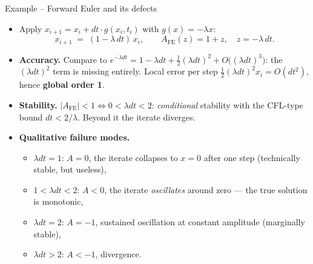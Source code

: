 \documentclass[11pt,aspectratio=169]{beamer}
\begin{document}
\begin{frame}{Example -- Forward Euler and its defects}

\begin{itemize}

\item Apply $x_{i+1} = x_i + dt\cdot g(x_i,t_i)$ with $g(x)=-\lambda x$:
  \[
  \boxed{\;x_{i+1} \;=\; (1 - \lambda\,dt)\,x_i,\qquad A_{\mathrm{FE}}(z) = 1+z,\quad z=-\lambda\,dt.\;}
  \]

\item \textbf{Accuracy.} Compare to $e^{-\lambda dt} = 1 - \lambda dt
  + \tfrac12(\lambda dt)^2 + O\bigl((\lambda dt)^3\bigr)$: the
  $(\lambda dt)^2$ term is missing entirely. Local error per step
  $\tfrac12(\lambda dt)^2 x_i = O(dt^2)$, hence \textbf{global order 1}.\newline

\item \textbf{Stability.} $|A_{\mathrm{FE}}| < 1 \iff 0 < \lambda dt
  < 2$: \emph{conditional} stability with the CFL-type bound $dt <
  2/\lambda$. Beyond it the iterate diverges.\newline

\item \textbf{Qualitative failure modes.}
  \begin{itemize}
  \item $\lambda dt = 1$: $A=0$, the iterate collapses to $x=0$ after
    one step (technically stable, but useless),
  \item $1 < \lambda dt < 2$: $A < 0$, the iterate \emph{oscillates}
    around zero — the true solution is monotonic,
  \item $\lambda dt = 2$: $A = -1$, sustained oscillation at constant
    amplitude (marginally stable),
  \item $\lambda dt > 2$: $A < -1$, divergence.
  \end{itemize}

\end{itemize}

\end{frame}
\end{document}

